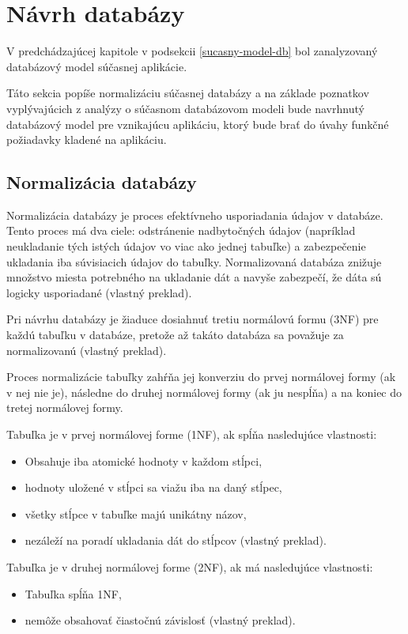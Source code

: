 \pagebreak

\section{Návrh databázy}
V predchádzajúcej kapitole v podsekcii \ref{sucasny-model-db} bol zanalyzovaný databázový model súčasnej aplikácie.

Táto sekcia popíše normalizáciu súčasnej databázy a na základe poznatkov vyplývajúcich z analýzy o súčasnom databázovom modeli bude navrhnutý databázový model pre vznikajúcu aplikáciu, ktorý bude brať do úvahy funkčné požiadavky kladené na aplikáciu.

\subsection{Normalizácia databázy}
Normalizácia databázy je proces efektívneho usporiadania údajov v databáze. Tento proces má dva ciele: odstránenie nadbytočných údajov (napríklad neukladanie tých istých údajov vo viac ako jednej tabuľke) a zabezpečenie ukladania iba  súvisiacich údajov do tabuľky. Normalizovaná databáza znižuje množstvo miesta potrebného na ukladanie dát a navyše zabezpečí, že dáta sú logicky usporiadané \cite{co-je-normalizacia} (vlastný preklad).

Pri návrhu databázy je žiaduce dosiahnuť tretiu normálovú formu (3NF) pre každú tabuľku v databáze, pretože až takáto databáza sa považuje za normalizovanú \cite{normalizovana-tabulka} (vlastný preklad).

Proces normalizácie tabuľky zahŕňa jej konverziu do prvej normálovej formy (ak v nej nie je), následne do druhej normálovej formy (ak ju nespĺňa) a na koniec do tretej normálovej formy.

Tabuľka je v prvej normálovej forme (1NF), ak spĺňa nasledujúce vlastnosti:
\begin{itemize}
	\item Obsahuje iba atomické hodnoty v každom stĺpci,
	\item hodnoty uložené v stĺpci sa viažu iba na daný stĺpec,
	\item všetky stĺpce v tabuľke majú unikátny názov,
	\item nezáleží na poradí ukladania dát do stĺpcov \cite{typy-normalizacie} (vlastný preklad). 
\end{itemize}

Tabuľka je v druhej normálovej forme (2NF), ak má nasledujúce vlastnosti:
\begin{itemize}
	\item Tabuľka spĺňa 1NF,
	\item nemôže obsahovať čiastočnú závislosť \cite{typy-normalizacie} (vlastný preklad).
\end{itemize}

